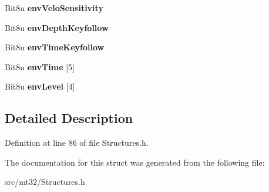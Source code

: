 \begin{DoxyCompactItemize}
\item 
\hypertarget{structMT32Emu_1_1TimbreParam_1_1PartialParam_1_1TVFParam_a524560f176b5bb134edab1cb5ae326c7}{Bit8u {\bfseries env\-Velo\-Sensitivity}}\label{structMT32Emu_1_1TimbreParam_1_1PartialParam_1_1TVFParam_a524560f176b5bb134edab1cb5ae326c7}

\item 
\hypertarget{structMT32Emu_1_1TimbreParam_1_1PartialParam_1_1TVFParam_a35c1c6952927b921eab9e6c10a60963b}{Bit8u {\bfseries env\-Depth\-Keyfollow}}\label{structMT32Emu_1_1TimbreParam_1_1PartialParam_1_1TVFParam_a35c1c6952927b921eab9e6c10a60963b}

\item 
\hypertarget{structMT32Emu_1_1TimbreParam_1_1PartialParam_1_1TVFParam_a2d0c5e93d3be3c6c29fff00948a374ad}{Bit8u {\bfseries env\-Time\-Keyfollow}}\label{structMT32Emu_1_1TimbreParam_1_1PartialParam_1_1TVFParam_a2d0c5e93d3be3c6c29fff00948a374ad}

\item 
\hypertarget{structMT32Emu_1_1TimbreParam_1_1PartialParam_1_1TVFParam_a1453a266f05a1fd55ba8a2dc269da02b}{Bit8u {\bfseries env\-Time} \mbox{[}5\mbox{]}}\label{structMT32Emu_1_1TimbreParam_1_1PartialParam_1_1TVFParam_a1453a266f05a1fd55ba8a2dc269da02b}

\item 
\hypertarget{structMT32Emu_1_1TimbreParam_1_1PartialParam_1_1TVFParam_a75d8258963e17124ab52bf3db0b9a341}{Bit8u {\bfseries env\-Level} \mbox{[}4\mbox{]}}\label{structMT32Emu_1_1TimbreParam_1_1PartialParam_1_1TVFParam_a75d8258963e17124ab52bf3db0b9a341}

\end{DoxyCompactItemize}


\subsection{Detailed Description}


Definition at line 86 of file Structures.\-h.



The documentation for this struct was generated from the following file\-:\begin{DoxyCompactItemize}
\item 
src/mt32/Structures.\-h\end{DoxyCompactItemize}
